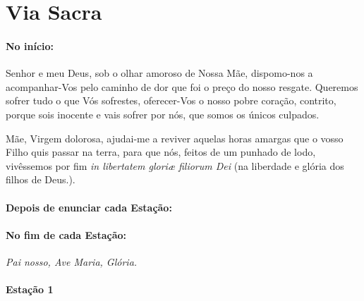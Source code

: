 \section{Via Sacra}

\paragraph{No início:}

 Senhor e meu Deus, sob o olhar amoroso de Nossa Mãe, dispomo-nos a acompanhar-Vos pelo caminho de dor que foi o preço do nosso resgate.
Queremos sofrer tudo o que Vós sofrestes, oferecer-Vos o nosso pobre coração, contrito, porque sois inocente e vais sofrer por nós, que somos os únicos culpados.

 Mãe, Virgem dolorosa, ajudai-me a reviver aquelas horas amargas que o vosso Filho quis passar na terra, para que nós, feitos de um punhado de lodo, vivêssemos por fim \emph{in libertatem gloriæ filiorum Dei} (na liberdade e glória dos filhos de Deus.).

\paragraph{Depois de enunciar cada Estação:}

\begin{paracol}{2}\switchcolumn{}\switchcolumn*{}\switchcolumn{}\end{paracol}

\paragraph{No fim de cada Estação:}
\emph{Pai nosso, Ave Maria, Glória.}
\begin{paracol}{2}\switchcolumn{}\switchcolumn*{}\switchcolumn{}\end{paracol}

\newpage

\paragraph{Estação 1}

